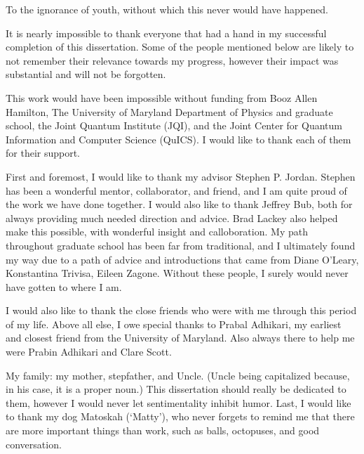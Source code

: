 \documentclass[letterpaper,12pt]{umd-thesis}
\numberwithin{equation}{chapter}
\numberwithin{thm}{chapter}
\numberwithin{lem}{chapter}
\numberwithin{cor}{chapter}
\numberwithin{definition}{chapter}
\begin{document}
\begin{preliminary}

	\begin{dedication}
		To the ignorance of youth, without which this never would have happened.
	\end{dedication}
%
	\begin{acknowledgements}	
		It is nearly impossible to thank everyone that had a hand in my successful completion of this dissertation. Some of the people mentioned below are likely to not remember their relevance towards my progress, however their impact was substantial and will not be forgotten.
		
		This work would have been impossible without funding from Booz Allen Hamilton, The University of Maryland Department of Physics and graduate school, the Joint Quantum Institute (JQI), and the Joint Center for Quantum Information and Computer Science (QuICS). I would like to thank each of them for their support. 
		
		First and foremost, I would like to thank my advisor Stephen P. Jordan. Stephen has been a wonderful mentor, collaborator, and friend, and I am quite proud of the work we have done together. I would also like to thank Jeffrey Bub, both for always providing much needed direction and advice. Brad Lackey also helped make this possible, with wonderful insight and calloboration. My path throughout graduate school has been far from traditional, and I ultimately found my way due to a path of advice and introductions that came from Diane O'Leary, Konstantina Trivisa, Eileen Zagone. Without these people, I surely would never have gotten to where I am.
		
		I would also like to thank the close friends who were with me through this period of my life. Above all else, I owe special thanks to Prabal Adhikari, my earliest and closest friend from the University of Maryland. Also always there to help me were Prabin Adhikari and Clare Scott. 
		
		My family: my mother, stepfather, and Uncle. (Uncle being capitalized because, in his case, it is a proper noun.) This dissertation should really be dedicated to them, however I would never let sentimentality inhibit humor. Last, I would like to thank my dog Matoskah (`Matty'), who never forgets to remind me that there are more important things than work, such as balls, octopuses, and good conversation. 
	\end{acknowledgements}
\end{preliminary}
\end{document}
